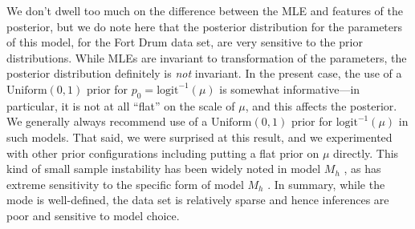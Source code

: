 We don't dwell too much on the difference between the MLE and features
of the posterior, 
 but we do note here that
the posterior distribution for the parameters of this model, for the
Fort Drum data set, are very sensitive to the prior
distributions. While MLEs are invariant to transformation of the
parameters, the posterior distribution definitely is {\it not}
invariant. In the present case, the use of a $\mbox{Uniform}(0,1)$
prior for $p_{0} = \mbox{logit}^{-1}(\mu)$ is somewhat
informative---in particular, it is not at all ``flat'' on the scale of
$\mu$, and this affects the posterior.  We generally always recommend
use of a $\mbox{Uniform}(0,1)$ prior for $\mbox{logit}^{-1}(\mu)$ in
such models. That said, we were surprised at this result, and we
experimented with other prior configurations including putting a flat
prior on $\mu$ directly. 
This kind of small sample instability has been widely
noted in model $M_h$ \citep{fienberg_etal:1999, dorazio_royle:2003},
as has extreme sensitivity to the specific form of model $M_{h}$
\citep{link:2003}.  In summary, while the mode is well-defined, the
data set is relatively sparse and hence inferences are poor and
sensitive to model choice.






